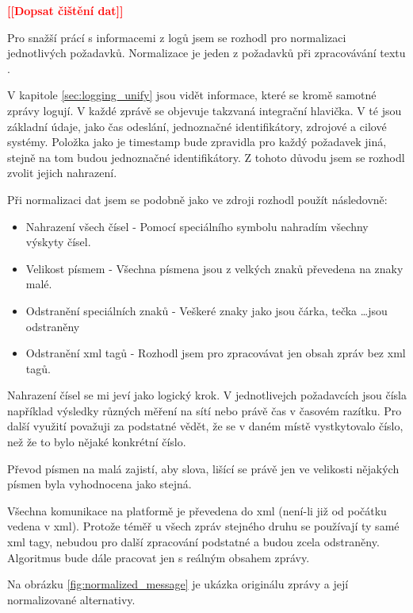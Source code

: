 \documentclass[thesis=M,czech]{FITthesis}[2012/10/20]
\newcommand{\todo}[1]{\textcolor{red}{\textbf{[[#1]]}}}
\begin{document}
		\todo{Dopsat čištění dat}
		
		Pro snažší prácí s informacemi z logů jsem se rozhodl pro normalizaci jednotlivých požadavků. Normalizace je jeden z požadavků při zpracovávání textu \cite{txtNrmlztn}.
		
		V kapitole \ref{sec:logging_unify} jsou vidět informace, které se kromě samotné zprávy logují. V každé zprávě se objevuje takzvaná integrační hlavička. V té jsou základní údaje, jako čas odeslání, jednoznačné identifikátory, zdrojové a cilové systémy. Položka jako je timestamp bude zpravidla pro každý požadavek jiná, stejně na tom budou jednoznačné identifikátory. Z tohoto důvodu jsem se rozhodl zvolit jejich nahrazení.
		
		Při normalizaci dat jsem se podobně jako ve zdroji \cite{Li_2013} rozhodl použít následovně:
		
		\begin{itemize} 
			\item Nahrazení všech čísel - Pomocí speciálního symbolu nahradím všechny výskyty čísel.
			\item Velikost písmem - Všechna písmena jsou z velkých znaků převedena na znaky malé.
			\item Odstranění speciálních znaků - Veškeré znaky jako jsou čárka, tečka \ldots jsou odstraněny
			\item Odstranění xml tagů - Rozhodl jsem pro zpracovávat jen obsah zpráv bez xml tagů.	
		\end{itemize}
	
		Nahrazení čísel se mi jeví jako logický krok. V jednotlivejch požadavcích jsou čísla například výsledky různých měření na sítí nebo právě čas v časovém razítku. Pro další využití považuji za podstatné vědět, že se v daném místě vystkytovalo číslo, než že to bylo nějaké konkrétní číslo.
		
		Převod písmen na malá zajistí, aby slova, lišící se právě jen ve velikosti nějakých písmen byla vyhodnocena jako stejná.
		
		Všechna komunikace na platformě je převedena do xml (není-li již od počátku vedena v xml). Protože téměř u všech zpráv stejného druhu se používají ty samé xml tagy, nebudou pro další zpracování podstatné a budou zcela odstraněny. Algoritmus bude dále pracovat jen s reálným obsahem zprávy. 
		
		Na obrázku \ref{fig:normalized_message} je ukázka originálu zprávy a její normalizované alternativy.
		
\end{document}
